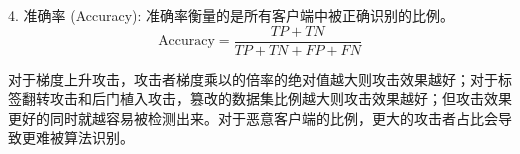\documentclass[conference]{IEEEtran}
\begin{document}
4. 准确率 (Accuracy): 准确率衡量的是所有客户端中被正确识别的比例。
    \[
    \text{Accuracy} = \frac{TP + TN}{TP + TN + FP + FN}
    \]



对于梯度上升攻击，攻击者梯度乘以的倍率的绝对值越大则攻击效果越好；对于标签翻转攻击和后门植入攻击，篡改的数据集比例越大则攻击效果越好；但攻击效果更好的同时就越容易被检测出来。对于恶意客户端的比例，更大的攻击者占比会导致更难被算法识别。

\end{document}
